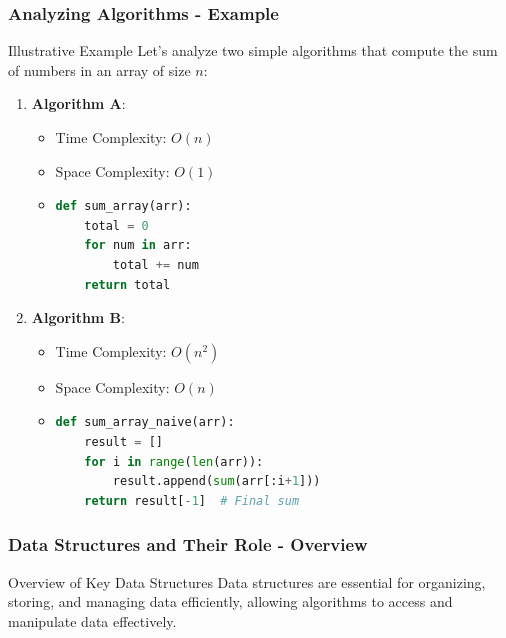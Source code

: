 \documentclass{beamer}
\begin{document}
\begin{frame}[fragile]
    \frametitle{Analyzing Algorithms - Example}

    \begin{block}{Illustrative Example}
        Let’s analyze two simple algorithms that compute the sum of numbers in an array of size $n$:
        \begin{enumerate}
            \item \textbf{Algorithm A}:
            \begin{itemize}
                \item Time Complexity: $O(n)$
                \item Space Complexity: $O(1)$
                \item \begin{lstlisting}[language=python]
def sum_array(arr):
    total = 0
    for num in arr:
        total += num
    return total
                \end{lstlisting}
            \end{itemize}
            
            \item \textbf{Algorithm B}:
            \begin{itemize}
                \item Time Complexity: $O(n^2)$
                \item Space Complexity: $O(n)$
                \item \begin{lstlisting}[language=python]
def sum_array_naive(arr):
    result = []
    for i in range(len(arr)):
        result.append(sum(arr[:i+1]))
    return result[-1]  # Final sum
                \end{lstlisting}
            \end{itemize}
        \end{enumerate}
    \end{block}
\end{frame}

\begin{frame}
    \frametitle{Data Structures and Their Role - Overview}
    \begin{block}{Overview of Key Data Structures}
        Data structures are essential for organizing, storing, and managing data efficiently, allowing algorithms to access and manipulate data effectively.
    \end{block}
\end{frame}
\end{document}
